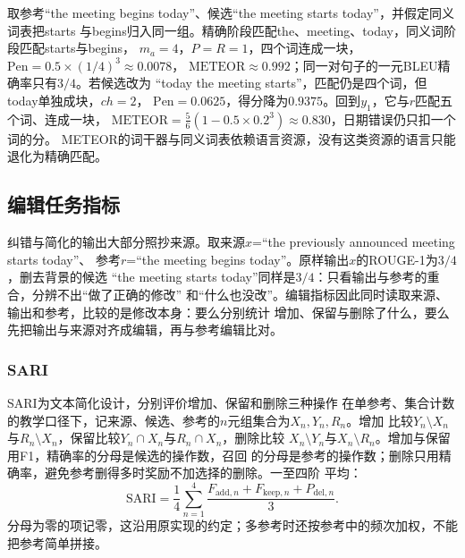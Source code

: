 取参考“the meeting begins today”、候选“the meeting starts today”，并假定同义词表把starts
与begins归入同一组。精确阶段匹配the、meeting、today，同义词阶段匹配starts与begins，
$m_a=4$，$P=R=1$，四个词连成一块，$\mathrm{Pen}=0.5\times(1/4)^3\approx0.0078$，
$\mathrm{METEOR}\approx0.992$；同一对句子的一元BLEU精确率只有$3/4$。若候选改为
“today the meeting starts”，匹配仍是四个词，但today单独成块，$\mathit{ch}=2$，
$\mathrm{Pen}=0.0625$，得分降为$0.9375$。回到$y_1$，它与$r$匹配五个词、连成一块，
$\mathrm{METEOR}=\tfrac56(1-0.5\times0.2^3)\approx0.830$，日期错误仍只扣一个词的分。
METEOR的词干器与同义词表依赖语言资源，没有这类资源的语言只能退化为精确匹配。

\subsection{编辑任务指标}
\label{sec:nlp-generation-edit-metrics}

纠错与简化的输出大部分照抄来源。取来源$x$=“the previously announced meeting starts today”、
参考$r$=“the meeting begins today”。原样输出$x$的ROUGE-1为$3/4$，删去背景的候选
“the meeting starts today”同样是$3/4$：只看输出与参考的重合，分辨不出“做了正确的修改”
和“什么也没改”。编辑指标因此同时读取来源、输出和参考，比较的是修改本身：要么分别统计
增加、保留与删除了什么，要么先把输出与来源对齐成编辑，再与参考编辑比对。

\subsubsection{SARI}
\label{sec:nlp-generation-sari}

SARI为文本简化设计，分别评价增加、保留和删除三种操作
在单参考、集合计数的教学口径下，记来源、候选、参考的$n$元组集合为$X_n,Y_n,R_n$。增加
比较$Y_n\setminus X_n$与$R_n\setminus X_n$，保留比较$Y_n\cap X_n$与$R_n\cap X_n$，删除比较
$X_n\setminus Y_n$与$X_n\setminus R_n$。增加与保留用F1，精确率的分母是候选的操作数，召回
的分母是参考的操作数；删除只用精确率，避免参考删得多时奖励不加选择的删除。一至四阶
平均：
\begin{equation}
  \mathrm{SARI}=\frac{1}{4}\sum_{n=1}^{4}
  \frac{F_{\mathrm{add},n}+F_{\mathrm{keep},n}+P_{\mathrm{del},n}}{3}.
  \label{eq:nlp-generation-sari}
\end{equation}
分母为零的项记零，这沿用原实现的约定；多参考时还按参考中的频次加权，不能把参考简单拼接。


